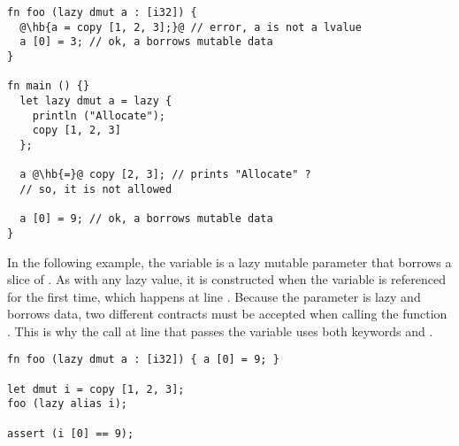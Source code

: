 \begin{lstlisting}[style=coloredverbatim, escapechar=@]
fn foo (lazy dmut a : [i32]) {
  @\hb{a = copy [1, 2, 3];}@ // error, a is not a lvalue
  a [0] = 3; // ok, a borrows mutable data
}

fn main () {}
  let lazy dmut a = lazy {
    println ("Allocate");
    copy [1, 2, 3]
  };

  a @\hb{=}@ copy [2, 3]; // prints "Allocate" ?
  // so, it is not allowed

  a [0] = 9; // ok, a borrows mutable data
}
\end{lstlisting}

In the following example, the variable  is a lazy mutable parameter
that borrows a slice of . As with any lazy value, it is constructed
when the variable  is referenced for the first time, which happens at
line . Because the parameter  is lazy and borrows data, two
different contracts must be accepted when calling the function . This
is why the call at line  that passes the variable  uses both
keywords  and .

\begin{lstlisting}[style=coloredverbatim, caption=Example of lazy mutable parameter]
fn foo (lazy dmut a : [i32]) { a [0] = 9; }

let dmut i = copy [1, 2, 3];
foo (lazy alias i);

assert (i [0] == 9);
\end{lstlisting}


\vfill%
\pagebreak

